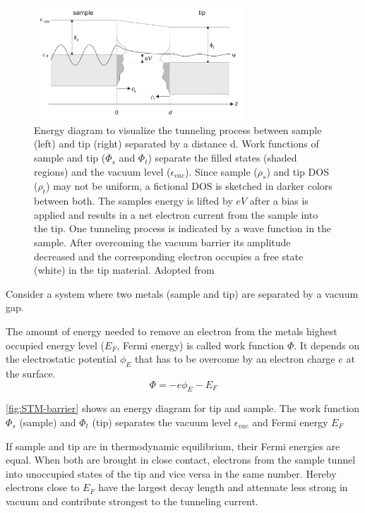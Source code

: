 \documentclass[
10pt,					%
a4paper,				%
twoside,				%
BCOR=8mm,				%
headings=normal,		%
headsepline,			%
footsepline,			%
plainfootsepline,		%
]{scrbook}
\begin{document}
\begin{figure}[]\centering
	\includegraphics[width=0.7\textwidth]{./images/tunnel-barrier}
	\caption{Energy diagram to visualize the tunneling process between sample (left) and tip (right) separated by a distance d. Work functions of sample and tip ($\Phi_s$ and $\Phi_t$) separate the filled states (shaded regions) and the vacuum level ($\epsilon_{vac}$). Since sample ($\rho_s$) and tip DOS ($\rho_t$) may not be uniform, a fictional DOS is sketched in darker colors between both. The samples energy is lifted by $eV$ after a bias is applied and results in a net electron current from the sample into the tip. One tunneling process is indicated by a wave function in the sample. After overcoming the vacuum barrier its amplitude decreased and the corresponding electron occupies a free state (white) in the tip material.  Adopted from \cite{diss-schunack}}
	\label{fig:STM-barrier}
\end{figure}

Consider a system where two metals (sample and tip) are separated by a vacuum gap. 

The amount of energy needed to remove an electron from the metals highest occupied energy level ($E_F$, Fermi energy) is called work function $\Phi$. It depends on the electrostatic potential $\phi_E$ that has to be overcome by an electron charge $e$ at the surface.
$$ \Phi = -e \phi_E - E_F $$

\autoref{fig:STM-barrier} shows an energy diagram for tip and sample. The work function $\Phi_s$ (sample) and $\Phi_t$ (tip) separates the vacuum level $\epsilon_{vac}$ and Fermi energy $E_F$

If sample and tip are in thermodynamic equilibrium, their Fermi energies are equal.
When both are brought in close contact, electrons from the sample tunnel into unoccupied states of the tip and vice versa in the same number. Hereby electrons close to $E_F$ have the largest decay length and attenuate less strong in vacuum and contribute strongest to the tunneling current.
\end{document}
